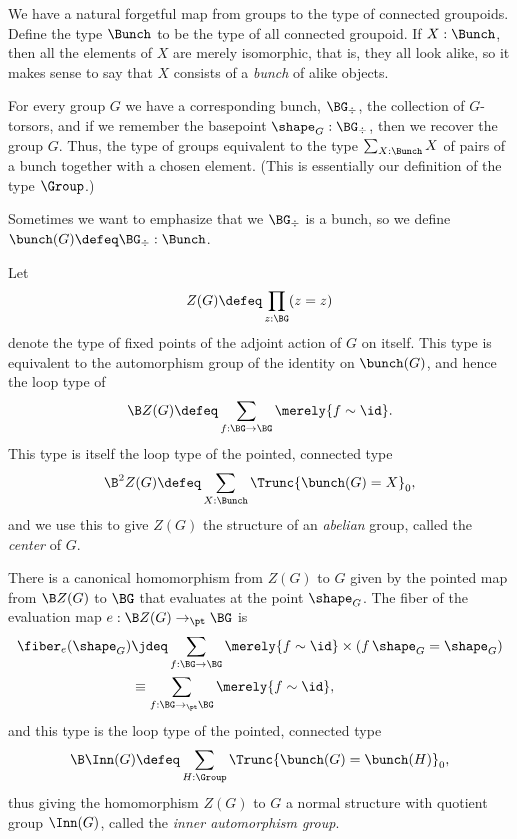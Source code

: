 We have a natural forgetful map from groups to the type of connected groupoids.
Define the type $\Bunch$ to be the type of all connected groupoid.
If $X:\Bunch$, then all the elements of $X$ are merely isomorphic,
that is, they all look alike,
so it makes sense to say that $X$ consists of a \emph{bunch} of alike objects.

For every group $G$ we have a corresponding bunch, $\BG_\div$,
\ie{} the collection of $G$-torsors,
and if we remember the basepoint $\shape_G : \BG_\div$,
then we recover the group $G$.
Thus, the type of groups equivalent to the type
$\sum_{X : \Bunch} X$
of pairs of a bunch together with a chosen element.
(This is essentially our definition of the type $\Group$.)

Sometimes we want to emphasize that we $\BG_\div$ is a bunch,
so we define $\bunch(G) \defeq \BG_\div : \Bunch$.

\begin{definition}
  \label{def:center}
  Let
  $$Z(G) \defeq \prod_{z : \BG}(z = z)$$ denote the type of fixed points of the adjoint action of $G$ on itself.
  This type is equivalent to the automorphism group of the identity on $\bunch(G)$,
  and hence the loop type of
  \[
    \B Z(G) \defeq \sum_{f : \BG \to \BG} \merely{f \sim \id}.
  \]
  This type is itself the loop type of the pointed, connected type
  \[
    \B^2Z(G) \defeq \sum_{X : \Bunch}\Trunc{\bunch(G) = X}_0,
  \]
  and we use this to give $Z(G)$ the structure of an \emph{abelian} group,
  called the \emph{center} of $G$.
\end{definition}
There is a canonical homomorphism from $Z(G)$ to $G$ given by the pointed map
from $\B Z(G)$ to $\BG$ that evaluates at the point $\shape_G$.
The fiber of the evaluation map $e : \B Z(G) \to_\pt \BG$ is
\begin{align*}
  \fiber_e(\shape_G)
  &\jdeq \sum_{f : \BG \to \BG} \merely{f \sim \id} \times (\mathop f \shape_G = \shape_G) \\
  &\equiv \sum_{f : \BG \to_\pt \BG} \merely{f \sim \id},
\end{align*}
and this type is the loop type of the pointed, connected type
\[
  \B\Inn(G) \defeq \sum_{H : \Group} \Trunc{\bunch(G) = \bunch(H)}_0,
\]
thus giving the homomorphism $Z(G)$ to $G$ a normal structure with
quotient group $\Inn(G)$, called the \emph{inner automorphism group}.

